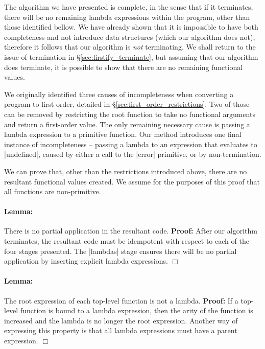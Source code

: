 \documentclass[preprint]{sigplanconf}
\begin{document}
The algorithm we have presented is complete, in the sense that if it terminates, there will be no remaining lambda expressions within the program, other than those identified bellow. We have already shown that it is impossible to have both completeness and not introduce data structures (which our algorithm does not), therefore it follows that our algorithm is \textit{not} terminating. We shall return to the issue of termination in \S\ref{sec:firstify_terminate}, but assuming that our algorithm does terminate, it is possible to show that there are no remaining functional values.

We originally identified three causes of incompleteness when converting a program to first-order, detailed in \S\ref{sec:first_order_restrictions}. Two of those can be removed by restricting the root function to take no functional arguments and return a first-order value. The only remaining necessary cause is passing a lambda expression to a primitive function. Our method introduces one final instance of incompleteness -- passing a lambda to an expression that evaluates to |undefined|, caused by either a call to the |error| primitive, or by non-termination.

We can prove that, other than the restrictions introduced above, there are no resultant functional values created. We assume for the purposes of this proof that all functions are non-primitive.

\newenvironment{lemma}[1]
    {\paragraph{Lemma:} #1 \textbf{Proof:} }
    {\hfill$\Box$}

\begin{lemma}{There is no partial application in the resultant code.}
After our algorithm terminates, the resultant code must be idempotent with respect to each of the four stages presented. The |lambdas| stage ensures there will be no partial application by inserting explicit lambda expressions.
\end{lemma}

\begin{lemma}{The root expression of each top-level function is not a lambda.}
If a top-level function is bound to a lambda expression, then the arity of the function is increased and the lambda is no longer the root expression. Another way of expressing this property is that all lambda expressions must have a parent expression.
\end{lemma}
\end{document}
